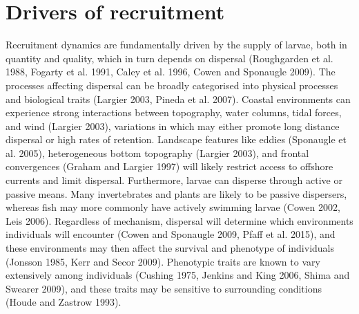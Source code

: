 \documentclass[]{book}
\begin{document}
\section{Drivers of recruitment}\label{drivers-of-recruitment}

Recruitment dynamics are fundamentally driven by the supply of larvae,
both in quantity and quality, which in turn depends on dispersal
(Roughgarden et al. 1988, Fogarty et al. 1991, Caley et al. 1996, Cowen
and Sponaugle 2009). The processes affecting dispersal can be broadly
categorised into physical processes and biological traits (Largier 2003,
Pineda et al. 2007). Coastal environments can experience strong
interactions between topography, water columns, tidal forces, and wind
(Largier 2003), variations in which may either promote long distance
dispersal or high rates of retention. Landscape features like eddies
(Sponaugle et al. 2005), heterogeneous bottom topography (Largier 2003),
and frontal convergences (Graham and Largier 1997) will likely restrict
access to offshore currents and limit dispersal. Furthermore, larvae can
disperse through active or passive means. Many invertebrates and plants
are likely to be passive dispersers, whereas fish may more commonly have
actively swimming larvae (Cowen 2002, Leis 2006). Regardless of
mechanism, dispersal will determine which environments individuals will
encounter (Cowen and Sponaugle 2009, Pfaff et al. 2015), and these
environments may then affect the survival and phenotype of individuals
(Jonsson 1985, Kerr and Secor 2009). Phenotypic traits are known to vary
extensively among individuals (Cushing 1975, Jenkins and King 2006,
Shima and Swearer 2009), and these traits may be sensitive to
surrounding conditions (Houde and Zastrow 1993).
\end{document}
